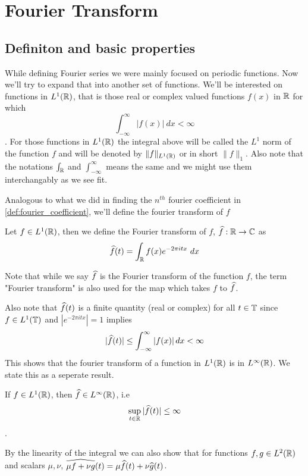 \chapter{Fourier Transform}

\section{Definiton and basic properties}
  While defining Fourier series we were mainly focused on periodic functions. Now we'll try to expand that into another set of functions. We'll be interested on functions in $L^1(\mathbb R)$, that is those real or complex valued functions $f(x)$ in $\mathbb R$ for which $$\int_{-\infty}^{\infty} |f(x)| \ dx < \infty$$. For those functions in $L^1(\mathbb R)$ the integral above will be called the $L^1$ norm of the function $f$ and will be denoted by $\|f\|_{L^1(\mathbb R)}$ or in short $\|f\|_1$. Also note that the notations $\int_{\mathbb R}$ and $\int_{-\infty}^{\infty}$ means the same and we might use them interchangably as we see fit.

  Analogous to what we did in finding the $n^{th}$ fourier coefficient in \autoref{def:fourier_coefficient}, we'll define the fourier transform of $f$

  \begin{definition}
    \label{def:fourier_transform_of_f}
    Let $f \in L^1(\mathbb R)$, then we define the Fourier transform of $f$, $\widehat{f} : \mathbb R \to \mathbb C$ as $$\hatf(t) = \int_{\R} f(x) e^{-2 \pi itx} \ dx$$
  \end{definition}
  Note that while we say $\widehat{f}$ is the Fourier transform of the function $f$, the term "Fourier transform" is also used for the map which takes $f$ to $\widehat{f}$.

  Also note that $\widehat{f}(t)$ is a finite quantity (real or complex) for all $t \in \mathbb T$ since $f\in L^1(\mathbb T)$ and $|e^{-2 \pi itx}| = 1$ implies $$|\widehat{f}(t)| \le \int_{-\infty}^{\infty}\left|f(x)\right| dx < \infty$$
  This shows that the fourier transform of a function in $L^1(\mathbb R)$ is in $L^\infty(\mathbb R)$. We state this as a seperate result.
  \begin{proposition}
    \label{prop:fourier_transform_of_L1_functions_in_R_are_bounded}
    If $f \in L^1(\mathbb R)$, then $\widehat{f} \in L^\infty(\mathbb R)$, i.e $$\sup_{t \in \mathbb R} |\widehat{f}(t)| \le \infty$$.
  \end{proposition}

  By the linearity of the integral we can also show that for functions $f, g \in L^2(\mathbb R)$ and scalars $\mu, \nu$, $\widehat{\mu f + \nu g}(t) = \mu \widehat{f}(t) + \nu\widehat{g}(t)$.
 
